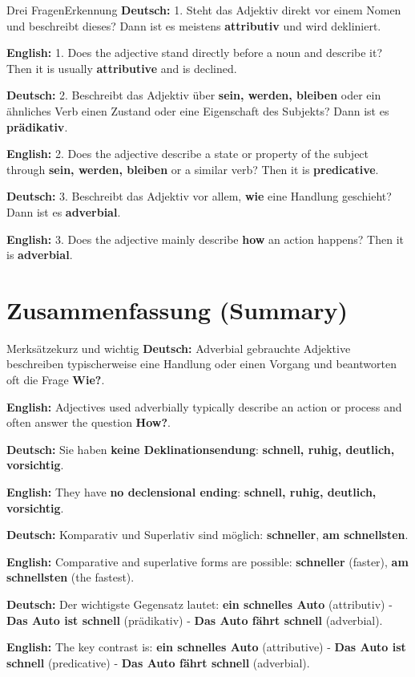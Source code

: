 \documentclass[a4paper,11pt]{article}
\newcommand{\GermanText}[1]{\textbf{Deutsch: }#1\par}
\newcommand{\EnglishText}[1]{{\small\color{SoftGray}\textbf{English: }#1\par}}
\begin{document}
        \begin{grammarentry}{Drei Fragen}{Erkennung}
            \GermanText{1. Steht das Adjektiv direkt vor einem Nomen und beschreibt dieses? Dann ist es meistens \textbf{attributiv} und wird dekliniert.}
            \EnglishText{1. Does the adjective stand directly before a noun and describe it? Then it is usually \textbf{attributive} and is declined.}

            \GermanText{2. Beschreibt das Adjektiv über \textbf{sein, werden, bleiben} oder ein ähnliches Verb einen Zustand oder eine Eigenschaft des Subjekts? Dann ist es \textbf{prädikativ}.}
            \EnglishText{2. Does the adjective describe a state or property of the subject through \textbf{sein, werden, bleiben} or a similar verb? Then it is \textbf{predicative}.}

            \GermanText{3. Beschreibt das Adjektiv vor allem, \textbf{wie} eine Handlung geschieht? Dann ist es \textbf{adverbial}.}
            \EnglishText{3. Does the adjective mainly describe \textbf{how} an action happens? Then it is \textbf{adverbial}.}
        \end{grammarentry}

    \section{Zusammenfassung \textnormal{(Summary)}}

        \begin{grammarentry}{Merksätze}{kurz und wichtig}
            \GermanText{Adverbial gebrauchte Adjektive beschreiben typischerweise eine Handlung oder einen Vorgang und beantworten oft die Frage \textbf{Wie?}.}
            \EnglishText{Adjectives used adverbially typically describe an action or process and often answer the question \textbf{How?}.}

            \GermanText{Sie haben \textbf{keine Deklinationsendung}: \textbf{schnell, ruhig, deutlich, vorsichtig}.}
            \EnglishText{They have \textbf{no declensional ending}: \textbf{schnell, ruhig, deutlich, vorsichtig}.}

            \GermanText{Komparativ und Superlativ sind möglich: \textbf{schneller}, \textbf{am schnellsten}.}
            \EnglishText{Comparative and superlative forms are possible: \textbf{schneller} (faster), \textbf{am schnellsten} (the fastest).}

            \GermanText{Der wichtigste Gegensatz lautet: \textbf{ein schnelles Auto} (attributiv) - \textbf{Das Auto ist schnell} (prädikativ) - \textbf{Das Auto fährt schnell} (adverbial).}
            \EnglishText{The key contrast is: \textbf{ein schnelles Auto} (attributive) - \textbf{Das Auto ist schnell} (predicative) - \textbf{Das Auto fährt schnell} (adverbial).}
        \end{grammarentry}
\end{document}
